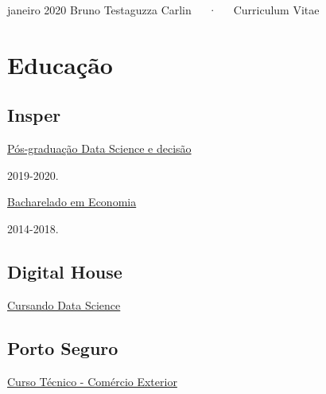 \documentclass[11pt, a4paper]{awesome-cv}
\begin{document}
\makecvheader

\makecvfooter
  {janeiro 2020}
    {Bruno Testaguzza Carlin~~~·~~~Curriculum Vitae}
  {\thepage}





\hypertarget{educauxe7uxe3o}{%
\section{Educação}\label{educauxe7uxe3o}}

\hypertarget{insper}{%
\subsection{Insper}\label{insper}}

\href{https://www.insper.edu.br/pos-graduacao/programas-avancados/programa-avancado-em-data-science-e-decisao/}{Pós-graduação Data Science e decisão}

2019-2020.

\href{https://www.insper.edu.br/graduacao/economia/}{Bacharelado em Economia}

2014-2018.

\hypertarget{digital-house}{%
\subsection{Digital House}\label{digital-house}}

\href{https://br.digitalhouse.com/curso/data-science/}{Cursando Data Science}

\hypertarget{porto-seguro}{%
\subsection{Porto Seguro}\label{porto-seguro}}

\href{https://www.portoseguro.org.br/conteudo/detalhe/currculo-brasileiro/ensino-mdio-comrcio-exterior}{Curso Técnico - Comércio Exterior}
\end{document}
